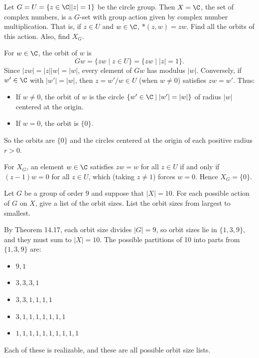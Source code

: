\begin{problem}[14.8]
  Let $G = U = \{z \in \C | |z| = 1\}$ be the circle group. Then $X = \C$, the set of complex numbers, is a $G$-set with group action given by complex number multiplication. That is, if $z \in U$ and $w \in \C$, $*(z, w) = zw$. Find all the orbits of this action. Also, find $X_G$.
\end{problem}

\begin{solution}
  For $w \in \C$, the orbit of $w$ is
  \[%
    Gw = \{zw \mid z \in U\} = \{zw \mid |z| = 1\}
  .\]%
  Since $|zw| = |z||w| = |w|$, every element of $Gw$ has modulus $|w|$. Conversely, if $w' \in \C$ with $|w'| = |w|$, then $z = w'/w \in U$ (when $w \neq 0$) satisfies $zw = w'$. Thus:
  \begin{itemize}
    \item If $w \neq 0$, the orbit of $w$ is the circle $\{w' \in \C \mid |w'| = |w|\}$ of radius $|w|$ centered at the origin.
    \item If $w = 0$, the orbit is $\{0\}$.
  \end{itemize}
  So the orbits are $\{0\}$ and the circles centered at the origin of each positive radius $r > 0$.

  For $X_G$, an element $w \in \C$ satisfies $zw = w$ for all $z \in U$ if and only if $(z-1)w = 0$ for all $z \in U$, which (taking $z \neq 1$) forces $w = 0$. Hence $X_G = \{0\}$.
\end{solution}

\begin{problem}[14.10]
  Let $G$ be a group of order 9 and suppose that $|X| = 10$. For each possible action of $G$ on $X$, give a list of the orbit sizes. List the orbit sizes from largest to smallest.
\end{problem}

\begin{solution}
  By Theorem 14.17, each orbit size divides $|G| = 9$, so orbit sizes lie in $\{1, 3, 9\}$, and they must sum to $|X| = 10$. The possible partitions of 10 into parts from $\{1, 3, 9\}$ are:
  \begin{itemize}
    \item $9, 1$
    \item $3, 3, 3, 1$
    \item $3, 3, 1, 1, 1, 1$
    \item $3, 1, 1, 1, 1, 1, 1, 1$
    \item $1, 1, 1, 1, 1, 1, 1, 1, 1, 1$
  \end{itemize}
  Each of these is realizable, and these are all possible orbit size lists.
\end{solution}

